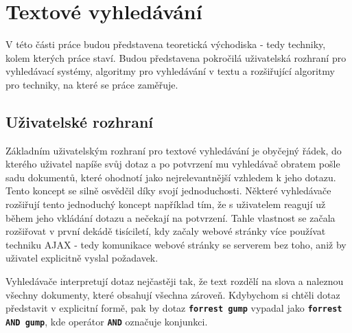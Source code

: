 \documentclass[11pt,letterpaper,oneside,openright]{book}
\newcommand{\bftt}[1]{\texttt{\textbf{#1}}}
\begin{document}

\chapter{Textové vyhledávání}
V této části práce budou představena teoretická východiska - tedy techniky,
kolem kterých práce staví. Budou představena pokročilá uživatelská rozhraní pro
vyhledávací systémy, algoritmy pro vyhledávání v textu a rozšiřující algoritmy
pro techniky, na které se práce zaměřuje.

\section{Uživatelské rozhraní}
Základním uživatelským rozhraní pro textové vyhledávání je obyčejný řádek, do
kterého uživatel napíše svůj dotaz a po potvrzení mu vyhledávač obratem pošle
sadu dokumentů, které ohodnotí jako nejrelevantnější vzhledem k jeho dotazu.
Tento koncept se silně osvědčil díky svojí jednoduchosti. Některé vyhledávače
rozšiřují tento jednoduchý koncept například tím, že s uživatelem reagují už
během jeho vkládání dotazu a nečekají na potvrzení. Tahle vlastnost se začala
rozšiřovat v první dekádě tisíciletí, kdy začaly webové stránky více používat
techniku AJAX - tedy komunikace webové stránky se serverem bez toho, aniž by
uživatel explicitně vyslal požadavek.

Vyhledávače interpretují dotaz nejčastěji tak, že text rozdělí na slova a
naleznou všechny dokumenty, které obsahují všechna zároveň. Kdybychom si chtěli
dotaz představit v explicitní formě, pak by dotaz \bftt{forrest gump} vypadal
jako \bftt{forrest AND gump}, kde operátor \bftt{AND} označuje konjunkci.
\end{document}

